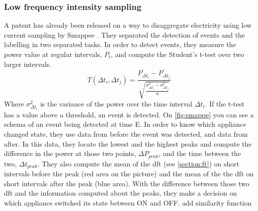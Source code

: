 \subsubsection{Low frequency intensity sampling}\label{section:low-freq}
A patent has already been released on a way to disaggregate electricity using low current sampling by Smappee \cite{bruneel2018energy}. They separated the detection of events and the labelling in two separated tasks. In order to detect events, they measure the power value at regular intervals, $P_t$, and compute the Student's t-test over two larger intervals.
\begin{equation} T(\Delta t_i, \Delta t_j) = \frac{\bar{P_{\Delta t_i}}-\bar{P_{\Delta t_j}}}{\sqrt{\frac{\sigma^2_{\Delta t_i} - \sigma^2_{\Delta t_j}}{n}}} \end{equation}
Where $\sigma^2_{\Delta t_i}$ is the variance of the power over the time interval $\Delta t_i$. If the t-test has a value above a threshold, an event is detected.
On \autoref{fig:smappe} you can see a schema of an event being detected at time E. In order to know which appliance changed state, they use data from before the event was detected, and data from after. In this data, they locate the lowest and the highest peaks and compute the difference in the power at those two points, $\Delta P_{peak}$, and the time between the two, $\Delta t_{peak}$. They also compute the mean of the \acrshort{dft} (see \autoref{section:ft}) on short intervals before the peak (red area on the picture) and the mean of the the \acrshort{dft} on short intervals after the peak (blue area). With the difference between those two \acrshort{dft} and the information computed about the peaks, they make a decision on which appliance switched its state between ON and OFF.
{\color{red}add similarity function}


